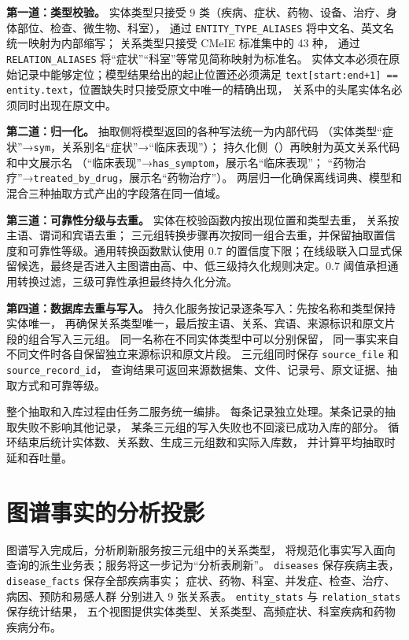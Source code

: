 \textbf{第一道：类型校验。}
实体类型只接受 9 类（疾病、症状、药物、设备、治疗、身体部位、检查、微生物、科室），
通过 \texttt{ENTITY\_TYPE\_ALIASES} 将中文名、英文名统一映射为内部缩写；
关系类型只接受 CMeIE 标准集中的 43 种，
通过 \texttt{RELATION\_ALIASES} 将“症状”“科室”等常见简称映射为标准名。
实体文本必须在原始记录中能够定位；模型结果给出的起止位置还必须满足
\texttt{text[start:end+1] == entity.text}，位置缺失时只接受原文中唯一的精确出现，
关系中的头尾实体名必须同时出现在原文中。

\textbf{第二道：归一化。}
抽取侧将模型返回的各种写法统一为内部代码
（实体类型“症状”→\texttt{sym}，关系别名“症状”→“临床表现”）；
持久化侧（）再映射为英文关系代码和中文展示名
（“临床表现”→\texttt{has\_symptom}，展示名“临床表现”；
“药物治疗”→\texttt{treated\_by\_drug}，展示名“药物治疗”）。
两层归一化确保离线词典、模型和混合三种抽取方式产出的字段落在同一值域。

\textbf{第三道：可靠性分级与去重。}
实体在校验函数内按出现位置和类型去重，
关系按主语、谓词和宾语去重；
三元组转换步骤再次按同一组合去重，并保留抽取置信度和可靠性等级。通用转换函数默认使用 0.7 的置信度下限；在线级联入口显式保留候选，最终是否进入主图谱由高、中、低三级持久化规则决定。0.7 阈值承担通用转换过滤，三级可靠性承担最终持久化分流。

\textbf{第四道：数据库去重与写入。}
持久化服务按记录逐条写入：先按名称和类型保持实体唯一，
再确保关系类型唯一，最后按主语、关系、宾语、来源标识和原文片段的组合写入三元组。
同一名称在不同实体类型中可以分别保留，
同一事实来自不同文件时各自保留独立来源标识和原文片段。
三元组同时保存 \texttt{source\_file} 和 \texttt{source\_record\_id}，
查询结果可返回来源数据集、文件、记录号、原文证据、抽取方式和可靠等级。

整个抽取和入库过程由任务二服务统一编排。
每条记录独立处理。某条记录的抽取失败不影响其他记录，
某条三元组的写入失败也不回滚已成功入库的部分。
循环结束后统计实体数、关系数、生成三元组数和实际入库数，
并计算平均抽取时延和吞吐量。

\section{图谱事实的分析投影}

图谱写入完成后，分析刷新服务按三元组中的关系类型，
将规范化事实写入面向查询的派生业务表；服务将这一步记为“分析表刷新”。
\texttt{diseases} 保存疾病主表，
\texttt{disease\_facts} 保存全部疾病事实；
症状、药物、科室、并发症、检查、治疗、病因、预防和易感人群
分别进入 9 张关系表。
\texttt{entity\_stats} 与 \texttt{relation\_stats} 保存统计结果，
五个视图提供实体类型、关系类型、高频症状、科室疾病和药物疾病分布。

